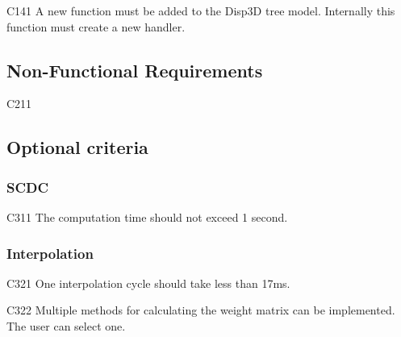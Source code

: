 	\begin{aims}
		
		\item[C141] A new function must be added to the Disp3D tree model. Internally this function must create a new 								handler.%
	\end{aims}
	
\subsection{Non-Functional Requirements}
	
	
	\begin{aims}

		\item[C211]	
	
	\end{aims}
	
\subsection{Optional criteria}
	
	
\subsubsection{SCDC}
	
	\begin{aims}
		
		\item[C311] The computation time should not exceed 1 second.
			
	\end{aims}
	
\subsubsection{Interpolation}

	\begin{aims}
	
		\item[C321] One interpolation cycle should take less than 17ms.
		\item[C322] Multiple methods for calculating the weight matrix can be implemented. The user can select one.
	
	\end{aims}
	
